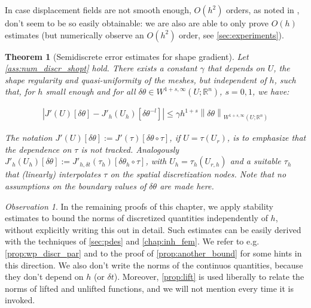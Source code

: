 \documentclass[english,a4paper,9pt,oneside]{scrbook}	%
\theoremstyle{break}
\newtheorem{thm}[equation]{Theorem}
\theoremstyle{remark}
\newtheorem{obs}[equation]{Observation}
\newcommand{\mR}{\mathbb{R}}
\newcommand{\norm}[1]{\left\lVert#1\right\rVert}
\newcommand{\te}{\theta}
\begin{document}

In case displacement fields are not smooth enough, $O(h^2)$ orders, as noted in \cite{paganini}, don't seem to be so easily obtainable: we are also are able to only prove $O(h)$ estimates (but numerically observe an $O(h^2)$ order, see \cref{sec:experiments}).


\begin{thm}[Semidiscrete error estimates for shape gradient]
\label{thm:superconvergence_sd}
Let \cref{ass:num_discr_shopt} hold. There exists a constant $\gamma$ that depends on $U$, the shape regularity and quasi-uniformity of the meshes, but independent of $h$, such that, for $h$ small enough and for all $\delta \te \in W^{1+s,\infty}(U;\mR^n)$, $s=0,1$, we have:

\begin{align*}
	\left |J'(U)[\delta \te] - J'_h(U_h)[\delta \te^{-l}] \right|\leq \gamma  h^{1+s} \norm{\delta \te}_{W^{1+s,\infty}(U;\mR^n)}
\end{align*}

%

The notation $J'(U)[\delta \te]:=J'(\tau)[\delta \te\circ \tau]$, if $U=\tau(U_r)$, is to emphasize that the dependence on $\tau$ is not tracked.
Analogously $J'_{h}(U_h)[\delta \te]:=J'_{h,\delta t}(\tau_h)[\delta \te_h\circ \tau]$, with $U_h = \tau_h(U_{r,h})$ and a suitable $\tau_h$ that (linearly) interpolates $\tau$ on the spatial discretization nodes. Note that no assumptions on the boundary values of $\delta \te$ are made here.

\end{thm}

\begin{obs}
In the remaining proofs of this chapter, we apply stability estimates to bound the norms of discretized quantities independently of $h$, without explicitly writing this out in detail. Such estimates can be easily derived with the techniques of \cref{sec:pdes} and \cref{chap:inh_fem}. We refer to e.g. \cref{prop:wp_discr_par} and to the proof of \cref{prop:another_bound} for some hints in this direction. We also don't write the norms of the continuos quantities, because they don't depend on $h$ (or $\delta t$). Moreover, \cref{prop:lift} is used liberally to relate the norms of lifted and unlifted functions, and we will not mention every time it is invoked.
\end{obs}
\end{document}
